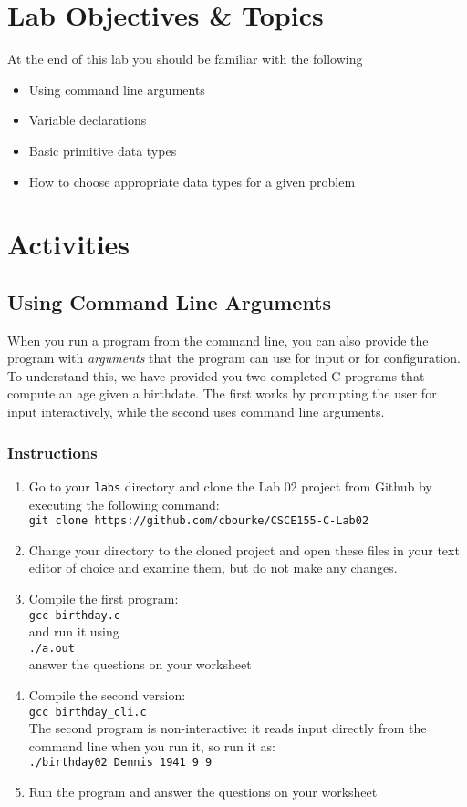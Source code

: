 \documentclass[12pt]{scrartcl}
\begin{document}
\section{Lab Objectives \& Topics}
At the end of this lab you should be familiar with the following
\begin{itemize}
  \item Using command line arguments
  \item Variable declarations 
  \item Basic primitive data types
  \item How to choose appropriate data types for a given problem
\end{itemize}

\section{Activities}

\subsection{Using Command Line Arguments}

When you run a program from the command line, you can also provide 
the program with \emph{arguments} that the program can use for input 
or for configuration.  To understand this, we have provided you two 
completed C programs that compute an age given a birthdate.  The 
first works by prompting the user for input interactively, while the second 
uses command line arguments.

\subsubsection*{Instructions}

\begin{enumerate}
  \item Go to your \texttt{labs} directory and clone the Lab 02 project
  	from Github by executing the following command:\\
	\texttt{git clone https://github.com/cbourke/CSCE155-C-Lab02}
  \item Change your directory to the cloned project and open these files in 
  	your text editor of choice and examine them, but do not make any changes.
  \item Compile the first program: \\
  \texttt{gcc birthday.c} \\
  and run it using \\
  \texttt{./a.out} \\
  answer the questions on your worksheet
  \item Compile the second version: \\
  \texttt{gcc birthday_cli.c} \\ 
  The second program is non-interactive: it reads input directly from the 
  command line when you run it, so run it as:\\
	\texttt{./birthday02 Dennis 1941 9 9}
  \item Run the program and answer the questions on your worksheet
\end{enumerate}
\end{document}
